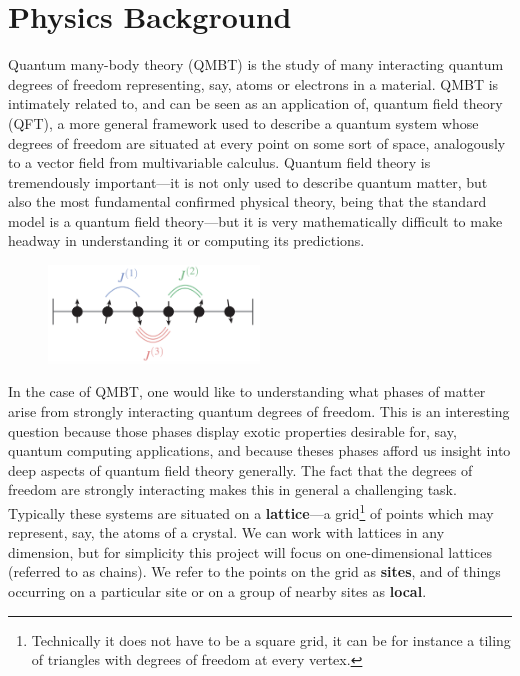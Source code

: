 \documentclass{article}
\begin{document}
\maketitle
\begin{tocbox}
\tableofcontents
\end{tocbox}

\section{Physics Background}
Quantum many-body theory (QMBT) is the study of many interacting quantum degrees of 
freedom representing, say, atoms or electrons in a material. QMBT is 
intimately related to, and can be seen as an application of, quantum field theory
(QFT), a more general framework used to describe a quantum system whose degrees 
of freedom are situated at every point on some sort of space, analogously to a 
vector field from multivariable calculus. Quantum field theory is tremendously 
important---it is not only used to describe quantum matter, but also the 
most fundamental confirmed physical theory, being that the standard model is a
quantum field theory---but it is very mathematically difficult to make headway 
in understanding it or computing its predictions. 

\begin{figure}[t]
	\centering
	\includegraphics[width=0.5\textwidth]{fig/lattice.png}
	\caption{}
	\label{fig:chain}
\end{figure}

In the case of QMBT, one would like to understanding what phases of matter arise 
from strongly interacting quantum degrees of freedom. This is an interesting 
question because those phases display exotic properties desirable for, say, 
quantum computing applications, and because theses phases afford us insight 
into deep aspects of quantum field theory generally. The fact that the degrees 
of freedom are strongly interacting makes this in general a challenging task. 
Typically these systems are situated on a \textbf{lattice}---a
grid\footnote{Technically it does not have to be a square grid, it can be for instance
a tiling of triangles with degrees of freedom at every vertex.} of points 
which may represent, say, the atoms of a crystal. We can work with lattices 
in any dimension, but for simplicity this project will focus on one-dimensional 
lattices (referred to as chains). We refer to the points on the grid as 
\textbf{sites}, and of things occurring on a particular site or on a group of 
nearby sites as \textbf{local}.
\end{document}
